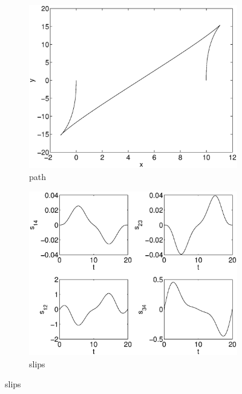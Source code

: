 \begin{figure}[h]
\begin{subfigure}[b]{\textwidth}
\centering
\includegraphics[height=0.3\textheight]{img/final_1_15_20_path.eps}
\caption{path}
\end{subfigure}

\begin{subfigure}[b]{\textwidth}
\centering
\includegraphics[height=0.3\textheight]{img/final_1_15_20_slips.eps}
\caption{slips}
\end{subfigure}


\end{figure}
